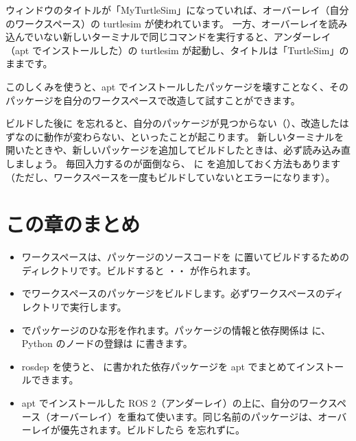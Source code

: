 
ウィンドウのタイトルが「MyTurtleSim」になっていれば、オーバーレイ（自分のワークスペース）の turtlesim が使われています。
一方、オーバーレイを読み込んでいない新しいターミナルで同じコマンドを実行すると、アンダーレイ（apt でインストールした）の turtlesim が起動し、タイトルは「TurtleSim」のままです。

このしくみを使うと、apt でインストールしたパッケージを壊すことなく、そのパッケージを自分のワークスペースで改造して試すことができます。

\begin{caution}
  ビルドした後に  を忘れると、自分のパッケージが見つからない（）、改造したはずなのに動作が変わらない、といったことが起こります。
  新しいターミナルを開いたときや、新しいパッケージを追加してビルドしたときは、必ず読み込み直しましょう。
  毎回入力するのが面倒なら、 に  を追加しておく方法もあります（ただし、ワークスペースを一度もビルドしていないとエラーになります）。
\end{caution}

\section*{この章のまとめ}

\begin{itemize}
  \item ワークスペースは、パッケージのソースコードを  に置いてビルドするためのディレクトリです。ビルドすると ・・ が作られます。
  \item {} でワークスペースのパッケージをビルドします。必ずワークスペースのディレクトリで実行します。
  \item {} でパッケージのひな形を作れます。パッケージの情報と依存関係は  に、Python のノードの登録は  に書きます。
  \item rosdep を使うと、 に書かれた依存パッケージを apt でまとめてインストールできます。
  \item apt でインストールした ROS 2（アンダーレイ）の上に、自分のワークスペース（オーバーレイ）を重ねて使います。同じ名前のパッケージは、オーバーレイが優先されます。ビルドしたら  を忘れずに。
\end{itemize}

